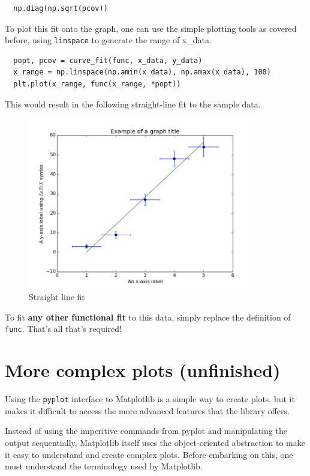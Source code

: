 \documentclass{article}
\begin{document}
\begin{lstlisting}
  np.diag(np.sqrt(pcov))
\end{lstlisting}

To plot this fit onto the graph, one can use the simple plotting tools
as covered before, using \texttt{linspace} to generate the range of
x\_data.

\begin{lstlisting}  
  popt, pcov = curve_fit(func, x_data, y_data)
  x_range = np.linspace(np.amin(x_data), np.amax(x_data), 100)
  plt.plot(x_range, func(x_range, *popt))
\end{lstlisting}

This would result in the following straight-line fit to the sample
data.

\begin{figure}[H]
  \centering
  \includegraphics[width=10cm]{ch4}
  \caption{Straight line fit}
  \label{fig:ch4}
\end{figure}

To fit \textbf{any other functional fit} to this data, simply replace
the definition of \texttt{func}. That's all that's required!

\section{More complex plots (unfinished)}
Using the \texttt{pyplot} interface to Matplotlib is a simple way to
create plots, but it makes it difficult to access the more advanced
features that the library offers.

Instead of using the imperitive commands from pyplot and manipulating
the output sequentially, Matplotlib itself uses the object-oriented
abstraction to make it easy to understand and create complex
plots. Before embarking on this, one must understand the terminology
used by Matplotlib.
\end{document}
